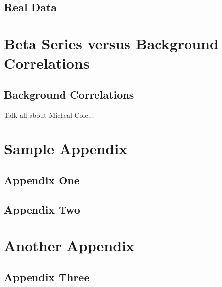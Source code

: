 \documentclass[phd,appendix,figures]{uithesis}
\begin{document}
\section{Real Data}

\chapter{Beta Series versus Background Correlations}

\section{Background Correlations}

Talk all about Micheal Cole...



\appendix

\chapter{Sample Appendix}

\section{Appendix One}
\blindtext

\section{Appendix Two}
\blindtext

\chapter{Another Appendix}

\section{Appendix Three}
\blindtext



 
\end{document}
